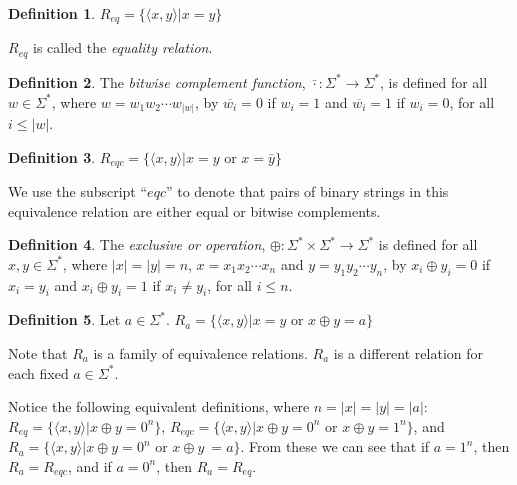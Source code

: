 \documentclass{article}
\theoremstyle{definition} \newtheorem{definition}[definition]{Definition}
\newcommand{\sigmastar}{\Sigma^{*}} %
\newcommand{\defn}[1]{\emph{#1}} %
\newcommand{\pair}[2]{\langle#1,#2\rangle} %
\begin{document}
\begin{definition}
  $R_{eq}=\{\pair{x}{y}|x=y\}$
\end{definition}
$R_{eq}$ is called the \defn{equality relation}.

\begin{definition}
  The \defn{bitwise complement function},
  $\bar\cdot\colon\sigmastar\to\sigmastar$, is defined for all
  $w\in\sigmastar$, where $w=w_1 w_2 \cdots w_{|w|}$, by $\overline{w_i}=0$ if
  $w_i=1$ and $\overline{w_i}=1$ if $w_i=0$, for all $i\leq|w|$.
\end{definition}
\begin{definition}
  $R_{eqc}=\{\pair{x}{y}|x=y$ or $x=\bar{y}\}$
\end{definition}
We use the subscript ``$eqc$'' to denote that pairs of binary strings in this
equivalence relation are either equal or bitwise complements.

\begin{definition}
  The \defn{exclusive or operation},
  $\oplus\colon\sigmastar\times\sigmastar\to\sigmastar$ is defined for all
  $x,y\in\sigmastar$, where $|x|=|y|=n$, $x=x_1 x_2 \cdots x_n$ and $y=y_1 y_2
  \cdots y_n$, by $x_i \oplus y_i=0$ if $x_i=y_i$ and $x_i \oplus y_i=1$ if
  $x_i\neq y_i$, for all $i\leq n$.
\end{definition}
\begin{definition}
  Let $a\in\sigmastar$. $R_{a}=\{\pair{x}{y}|x=y$ or $x\oplus y=a\}$
\end{definition}
Note that $R_{a}$ is a family of equivalence relations. $R_{a}$ is a different
relation for each fixed $a\in\sigmastar$.

Notice the following equivalent definitions, where $n=|x|=|y|=|a|$:
$R_{eq}=\{\pair{x}{y}|x \oplus y = 0^n\}$, $R_{eqc}=\{\pair{x}{y}|x \oplus y =
0^n$ or $x\oplus y = 1^n\}$, and $R_a=\{\pair{x}{y}|x \oplus y = 0^n$ or $x
\oplus y\ = a\}$. From these we can see that if $a=1^n$, then $R_a=R_{eqc}$,
and if $a=0^n$, then $R_a=R_{eq}$.
\end{document}
